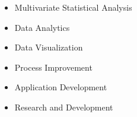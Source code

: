 

\begin{cvexpertise}
  \begin{itemize}
    \item Multivariate Statistical Analysis
    \item Data Analytics
    \item Data Visualization
    \vfill
    \item Process Improvement
    \item Application Development
    \item Research and Development
  \end{itemize}
\end{cvexpertise}

